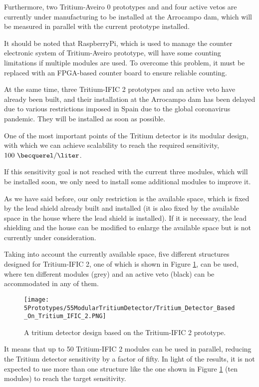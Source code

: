 Furthermore, two Tritium-Aveiro 0 prototypes and and four active vetos are currently under manufacturing to be installed at the Arrocampo dam, which will be measured in parallel with the current prototype installed.

It should be noted that RaspberryPi, which is used to manage the counter electronic system of Tritium-Aveiro prototype, will have some counting limitations if multiple modules are used. To overcome this problem, it must be replaced with an FPGA-based counter board to ensure reliable counting.

At the same time, three Tritium-IFIC 2 prototypes and an active veto have already been built, and their installation at the Arrocampo dam has been delayed due to various restrictions imposed in Spain due to the global coronavirus pandemic. They will be installed as soon as possible.

One of the most important points of the Tritium detector is its modular design, with which we can achieve scalability to reach the required sensitivity, $100~\becquerel/\liter$. 

If this sensitivity goal is not reached with the current three modules, which will be installed soon, we only need to install some additional modules to improve it.

As we have said before, our only restriction is the available space, which is fixed by the lead shield already built and installed (it is also fixed by the available space in the house where the lead shield is installed). If it is necessary, the lead shielding and the house can be modified to enlarge the available space but is not currently under consideration.

Taking into account the currently available space, five different structures designed for Tritium-IFIC 2, one of which is shown in Figure \ref{fig:TritiumMonitorIFIC2Design}, can be used, where ten different modules (grey) and an active veto (black) can be accommodated in any of them. 

\begin{figure}[h]
\centering
\texttt{[image: 5Prototypes/55ModularTritiumDetector/Tritium\_Detector\_Based\_On\_Tritium\_IFIC\_2.PNG]}
\caption{A tritium detector design based on the Tritium-IFIC 2 prototype.\label{fig:TritiumMonitorIFIC2Design}}
\end{figure}

It means that up to 50 Tritium-IFIC 2 modules can be used in parallel, reducing the Tritium detector sensitivity by a factor of fifty. In light of the results, it is not expected to use more than one structure like the one shown in Figure \ref{fig:TritiumMonitorIFIC2Design} (ten modules) to reach the target sensitivity.